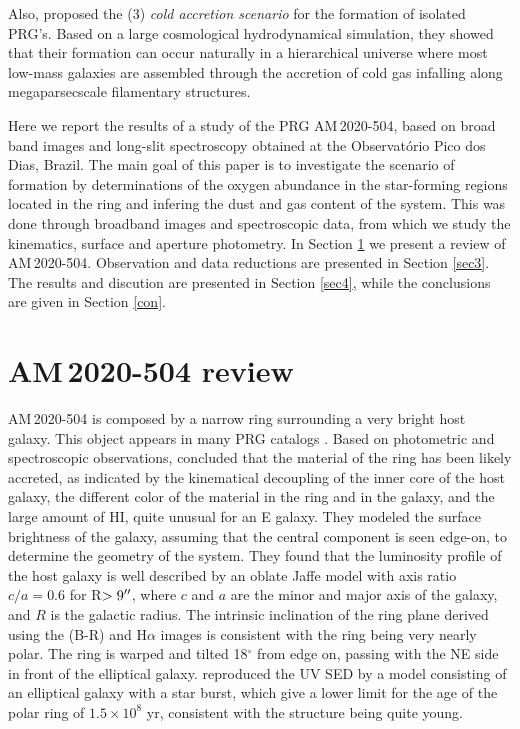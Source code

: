 \documentclass[useAMS,usenatbib]{mn2e}
\def\arcsec{\hbox{$^{\prime\prime}$} }
\begin{document}
Also, \cite{2006ApJ...636L..25M} proposed the (3) \textit{cold accretion
scenario} for the formation of isolated PRG's. Based on a large cosmological
hydrodynamical simulation, they showed that their formation can occur naturally
in a hierarchical universe where most low-mass galaxies are assembled through
the accretion of cold gas infalling along megaparsecscale filamentary
structures.

Here we report the results of a study of the PRG \mbox{\mbox{AM\,2020-504}},
based
on broad band images and long-slit spectroscopy obtained at
the Observat\'orio Pico dos Dias, Brazil. The main goal of this paper is to
investigate the scenario of formation  by determinations of the oxygen abundance
in the star-forming regions located in the ring and infering  the dust and gas
content of the system. This was done through broadband images and spectroscopic
data, from which we study the kinematics, surface and aperture photometry. In
Section \ref{sec2} we present a review of \mbox{\mbox{AM\,2020-504}}.
Observation and data reductions are presented in Section \ref{sec3}. The results
and discution are presented in Section \ref{sec4}, while the conclusions are
given in Section \ref{con}.

\section{\mbox{AM\,2020-504} review} \label{sec2}

\mbox{AM\,2020-504} is composed by a narrow ring
surrounding a very bright host galaxy. This object appears in many PRG catalogs
\citep[e.g.][]{1990AJ....100.1489W, 2003A&A...401..817B, 2002A&A...383..390R,
1998A&AS..129..357F, 2004A&A...422..941C}. Based on photometric and
spectroscopic observations, \cite{1993A&A...267...21A} concluded that the
material of the ring has been likely accreted, as indicated by the kinematical
decoupling of the inner core of the host galaxy, the different color of the
material in the ring and in the galaxy, and the large amount of HI, quite
unusual for an E galaxy. They modeled the surface brightness of the galaxy,
assuming that the central component is seen edge-on, to determine the geometry
of the system. They found that the luminosity profile of the host galaxy is well
described by an oblate Jaffe model with axis ratio $c/a = 0.6$ for R$>9\arcsec$,
where $c$ and $a$ are the minor and major axis of the galaxy, and $R$ is
the galactic radius.
The intrinsic inclination of the ring plane derived using the \mbox{(B-R)} and
H$\alpha$ images is consistent with the ring being very nearly polar. The ring
is warped and tilted 18$^\circ$ from edge on, passing with the NE side in front
of the elliptical galaxy. \cite{1993A&A...268..103A} reproduced the UV
SED by a model consisting of an elliptical galaxy with a star burst, which give
a lower limit for the age of the polar ring of $1.5\times10^8$ yr, consistent
with the structure being quite young. 
\end{document}
